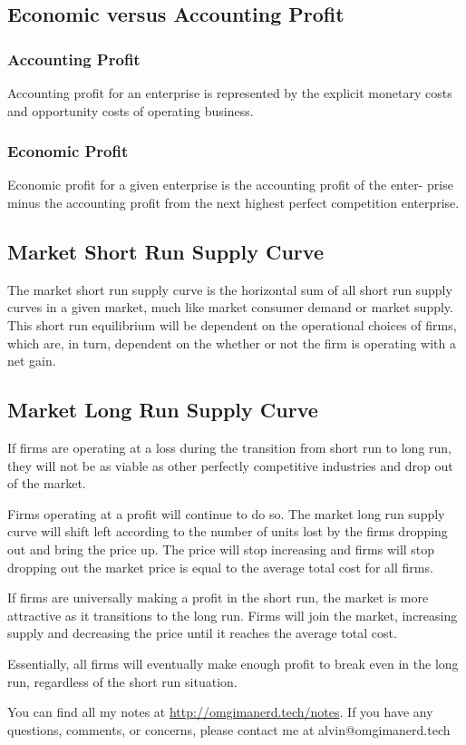\documentclass{article}
\begin{document}
\subsection{Economic versus Accounting Profit}

\subsubsection{Accounting Profit}
Accounting profit for an enterprise is represented by the explicit monetary
costs and opportunity costs of operating business.

\subsubsection{Economic Profit}
Economic profit for a given enterprise is the accounting profit of the enter-
prise minus the accounting profit from the next highest perfect competition
enterprise.

\subsection{Market Short Run Supply Curve}
The market short run supply curve is the horizontal sum of all short
run supply curves in a given market, much like market consumer demand
or market supply. This short run equilibrium will be dependent on the
operational choices of firms, which are, in turn, dependent on the whether or
not the firm is operating with a net gain.

\subsection{Market Long Run Supply Curve}
If firms are operating at a loss during the transition from short run to long
run, they will not be as viable as other perfectly competitive industries and
drop out of the market. \par
Firms operating at a profit will continue to do so.
The market long run supply curve will shift left according to the number of
units lost by the firms dropping out and bring the price up. The price will
stop increasing and firms will stop dropping out the market price is equal to
the average total cost for all firms. \par
If firms are universally making a profit in the short run, the market is more
attractive as it transitions to the long run. Firms will join the market,
increasing supply and decreasing the price until it reaches the average total
cost. \par
Essentially, all firms will eventually make enough profit to break even in the
long run, regardless of the short run situation.

\begin{center}
  You can find all my notes at \url{http://omgimanerd.tech/notes}. If you have
  any questions, comments, or concerns, please contact me at
  alvin@omgimanerd.tech
\end{center}
\end{document}
